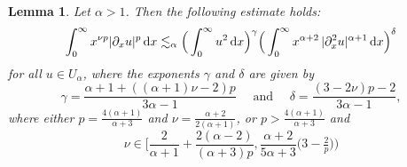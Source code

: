 \documentclass[reqno,12pt]{amsart}
\renewcommand{\d}{\ensuremath{\mathrm{d}}}
\renewcommand{\d}{\ensuremath{{\rm d}}}
\newtheorem{lemma}[theorem]{Lemma}
\numberwithin{equation}{section}
\begin{document}
%
\begin{lemma}\label{lem:weight xu lp'}
%
Let $\alpha >1$. Then the following estimate holds:
%
 \begin{equation}\label{eq:weight xu lp'}
\int_0^\infty x^{\nu p} |\partial _x u|^p \, \d x \lesssim_\alpha \Big(\int_0^\infty u^2 \, \d x\Big)^\gamma \Big(\int_0^\infty x^{\alpha+2} \, |\partial_x^2 u|^{\alpha+1} \, \d x\Big)^\delta
 \end{equation}
%
 for all $u \in U_\alpha$, where the exponents $\gamma$ and $\delta$ are given by
 \begin{equation*}
     \gamma = \frac{\alpha+1+((\alpha+1)\nu - 2) p}{3\alpha -1} \quad \text{ and } \quad \delta= \frac{(3-2\nu) p - 2}{3\alpha -1},
 \end{equation*}
where either $p = \frac{4(\alpha+1)}{\alpha+3}$ and $\nu = \frac{\alpha+2}{2(\alpha+1)}$, or $p>\frac{4(\alpha+1)}
%
{\alpha+3}$ and 
%
 \begin{equation*}
\nu \in \Big[\frac{2}{\alpha +1} + \frac{2(\alpha-2)}{(\alpha +3) p}, \frac{\alpha +2}{5\alpha +3} \big(3 - \tfrac 2 p \big)\Big) 
\end{equation*}
%
\end{lemma}
% 
\end{document}
